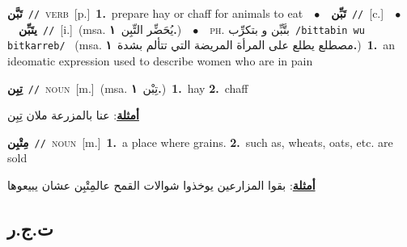 \documentclass[10pt,a4paper,twoside]{article} %
\begin{document}
\begin{multicols}{2}
{\setlength\topsep{0pt}\textbf{\foreignlanguage{arabic}{تَبَّن}}\ {\color{gray}\texttt{//}\color{black}}\ \textsc{verb}\ [p.]\ \textbf{1.}~prepare hay or chaff for animals to eat\ \ $\bullet$\ \ \setlength\topsep{0pt}\textbf{\foreignlanguage{arabic}{تَبِّن}}\ {\color{gray}\texttt{//}\color{black}}\ [c.]\ \ $\bullet$\ \ \setlength\topsep{0pt}\textbf{\foreignlanguage{arabic}{يتَبِّن}}\ {\color{gray}\texttt{//}\color{black}}\ [i.]\ \color{gray}(msa. \foreignlanguage{arabic}{يُحَضِّر التِّبِن}~\foreignlanguage{arabic}{\textbf{١.}})\color{black}\ \ $\bullet$\ \ \textsc{ph.} \color{gray} \foreignlanguage{arabic}{بتَّبِّن و بتكرِّب}\color{black}\ {\color{gray}\texttt{/{\sffamily bittabin wu bitkarreb}/}\color{black}}\ \color{gray} (msa. \foreignlanguage{arabic}{مصطلع يطلع على المرأة المريضة التي تتألم بشدة}~\foreignlanguage{arabic}{\textbf{١.}})\color{black}\ \textbf{1.}~an ideomatic expression used to describe women who are in pain\ } \vspace{2mm}

{\setlength\topsep{0pt}\textbf{\foreignlanguage{arabic}{تِبِن}}\ {\color{gray}\texttt{//}\color{black}}\ \textsc{noun}\ [m.]\ \color{gray}(msa. \foreignlanguage{arabic}{تِبْن}~\foreignlanguage{arabic}{\textbf{١.}})\color{black}\ \textbf{1.}~hay  \textbf{2.}~chaff\  \begin{flushright}\color{gray}\foreignlanguage{arabic}{\textbf{\underline{\foreignlanguage{arabic}{أمثلة}}}: عنا بالمزرعة ملان تِبِن}\end{flushright}\color{black}} \vspace{2mm}

{\setlength\topsep{0pt}\textbf{\foreignlanguage{arabic}{مِتْبِن}}\ {\color{gray}\texttt{//}\color{black}}\ \textsc{noun}\ [m.]\ \textbf{1.}~a place where grains.  \textbf{2.}~such as, wheats, oats, etc. are sold\  \begin{flushright}\color{gray}\foreignlanguage{arabic}{\textbf{\underline{\foreignlanguage{arabic}{أمثلة}}}: بقوا المزارعين يوخذوا شوالات القمح عالمِتْبِن عشان يبيعوها}\end{flushright}\color{black}} \vspace{2mm}

\vspace{-3mm}
\subsection*{\color{blue}\foreignlanguage{arabic}{ت.ج.ر}\color{blue}{}} 


\end{multicols}
\end{document}
